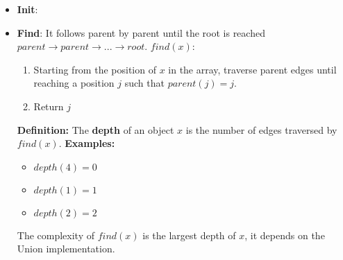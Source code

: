 \begin{itemize}
    \item \textbf{Init}:\newline\newline

    \item \textbf{Find}: It follows parent by parent until the root is reached $parent \rightarrow parent \rightarrow  ... \rightarrow root$.\newline\newline
    $find(x):$
    \begin{enumerate}
        \item Starting from the position of $x$ in the array, traverse parent edges until reaching a position $j$ such that $parent(j) = j$.

        \item Return $j$
    \end{enumerate}
    \textbf{Definition:} The \textbf{depth} of an object $x$ is the number of edges traversed by $find(x)$.\newline
    \textbf{Examples:}
    \begin{itemize}
        \item $depth(4) = 0$
        \item $depth(1) = 1$
        \item $depth(2) = 2$
    \end{itemize}
    The complexity of $find(x)$ is the largest depth of $x$, it depends on the Union implementation.


\end{itemize}
